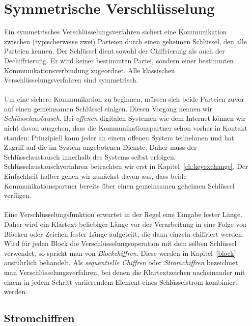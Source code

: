 \chapter{Symmetrische Verschlüsselung}
\label{symenc}

Ein symmetrisches Verschlüsselungsverfahren sichert eine Kommunikation zwischen (typischerweise zwei) Parteien durch einen geheimen Schlüssel, den alle Parteien kennen. Der Schlüssel dient sowohl der Chiffrierung als auch der Dechiffrierung. Er wird keiner bestimmten Partei, sondern einer bestimmten Kommunikationsverbindung zugeordnet. Alle klassischen Verschlüsselungsverfahren sind symmetrisch.\\ \ \\
Um eine sichere Kommunikation zu beginnen, müssen sich beide Parteien zuvor auf einen gemeinsamen Schlüssel einigen. Diesen Vorgang nennen wir \emph{Schlüsselaustausch}. Bei \emph{offenen} digitalen Systemen wie dem Internet können wir nicht davon ausgehen, dass die Kommunikationspartner schon vorher in Kontakt standen: Prinzipiell kann jeder an einem offenen System teilnehmen und hat Zugriff auf die im System angebotenen Dienste. Daher muss der
Schlüsselaustausch innerhalb des Systems selbst erfolgen. Schlüsselaustauschverfahren betrachten wir erst  in Kapitel~\ref{ch:keyexchange}. Der Einfachheit halber gehen wir zunächst davon aus, dass beide Kommunikationspartner bereits über einen gemeinsamen geheimen Schlüssel verfügen.\\ \ \\
Eine Verschlüsselungsfunktion erwartet in der Regel eine Eingabe fester Länge. Daher wird ein Klartext beliebiger Länge vor der Verarbeitung in eine Folge von Blöcken oder Zeichen fester Länge aufgeteilt, die dann einzeln chiffriert werden. Wird für jeden Block die Verschlüsselungsoperation mit dem selben Schlüssel verwendet, so spricht man von \emph{Blockchiffren}. Diese werden in Kapitel~\ref{block} ausführlich behandelt. Als \emph{sequentielle Chiffren} oder \emph{Stromchiffren} bezeichnet man Verschlüsselungsverfahren, bei denen die Klartextzeichen nacheinander mit einem in jedem Schritt variierendem Element eines Schlüsselstrom kombiniert werden.

\section{Stromchiffren}

